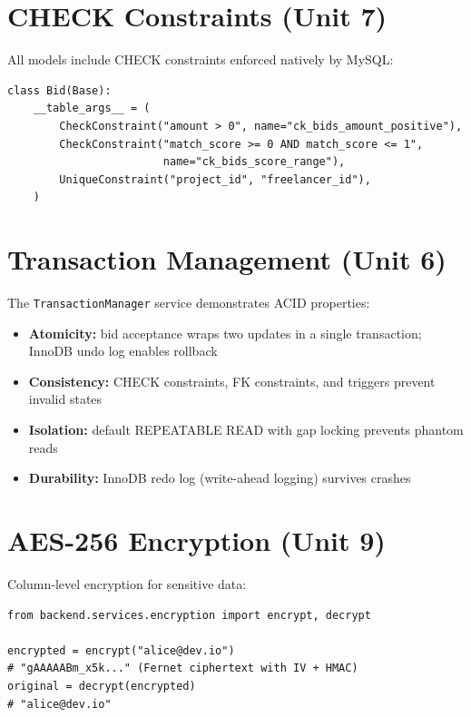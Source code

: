 \documentclass[12pt, a4paper]{report}
\begin{document}
\section{CHECK Constraints (Unit 7)}

All models include CHECK constraints enforced natively by MySQL:

\begin{lstlisting}[style=pythonstyle, caption={CHECK constraints defined in SQLAlchemy models}]
class Bid(Base):
    __table_args__ = (
        CheckConstraint("amount > 0", name="ck_bids_amount_positive"),
        CheckConstraint("match_score >= 0 AND match_score <= 1",
                        name="ck_bids_score_range"),
        UniqueConstraint("project_id", "freelancer_id"),
    )
\end{lstlisting}

\section{Transaction Management (Unit 6)}

The \texttt{TransactionManager} service demonstrates ACID properties:

\begin{itemize}
  \item \textbf{Atomicity:} bid acceptance wraps two updates in a single transaction; InnoDB undo log enables rollback
  \item \textbf{Consistency:} CHECK constraints, FK constraints, and triggers prevent invalid states
  \item \textbf{Isolation:} default REPEATABLE READ with gap locking prevents phantom reads
  \item \textbf{Durability:} InnoDB redo log (write-ahead logging) survives crashes
\end{itemize}

\section{AES-256 Encryption (Unit 9)}

Column-level encryption for sensitive data:

\begin{lstlisting}[style=pythonstyle, caption={AES-256 encryption service}]
from backend.services.encryption import encrypt, decrypt

encrypted = encrypt("alice@dev.io")
# "gAAAAABm_x5k..." (Fernet ciphertext with IV + HMAC)
original = decrypt(encrypted)
# "alice@dev.io"
\end{lstlisting}
\end{document}
